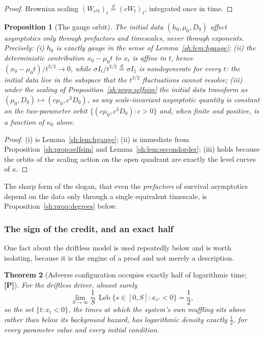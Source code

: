 \documentclass[11pt]{article}
\numberwithin{equation}{section}
\theoremstyle{plain}
\newtheorem{theorem}{Theorem}[section]
\newtheorem{proposition}[theorem]{Proposition}
\theoremstyle{definition}
\theoremstyle{remark}
\DeclareMathOperator{\Leb}{Leb}
\newcommand{\eqd}{\overset{d}{=}}
\begin{document}
\begin{proof}
Brownian scaling $(W_{c^2t})_t\eqd(cW_t)_t$, integrated once in time.
\end{proof}

\begin{proposition}[The gauge orbit]\label{sh:prop:gauge}
The initial data $(h_0,\mu_0,D_0)$ affect asymptotics only through
prefactors and timescales, never through exponents. Precisely:
\emph{(i)} $h_0$ is exactly gauge in the sense of
Lemma~\ref{sh:lem:hgauge};
\emph{(ii)} the deterministic contribution
$x_0-\mu_0t$ to $x_t$ is affine in $t$, hence
$(x_0-\mu_0t)/t^{3/2}\to0$, while $\sigma I_t/t^{3/2}\eqd\sigma I_1$ is
nondegenerate for every $t$: the initial data live in the subspace that the
$t^{3/2}$ fluctuations cannot resolve;
\emph{(iii)} under the scaling of Proposition~\ref{sh:prop:selfsim} the
initial data transform as $(\mu_0,D_0)\mapsto(c\mu_0,c^3D_0)$, so any
scale-invariant asymptotic quantity is constant on the two-parameter orbit
$\{(c\mu_0,c^3D_0):c>0\}$ and, when finite and positive, is a function of
$\kappa_0$ alone.
\end{proposition}

\begin{proof}
(i) is Lemma~\ref{sh:lem:hgauge}; (ii) is immediate from
Proposition~\ref{sh:prop:selfsim} and Lemma~\ref{sh:lem:secondorder};
(iii) holds because the orbits of the scaling action on the open quadrant
are exactly the level curves of $\kappa$.
\end{proof}

The sharp form of the slogan, that even the \emph{prefactors} of survival
asymptotics depend on the data only through a single equivalent timescale, is Proposition~\ref{sh:prop:degrees} below.

\subsubsection{The sign of the credit, and an exact half}
\label{gr1:subsub:sign}

One fact about the driftless model is used repeatedly below and is worth
isolating, because it is the engine of a proof and not merely a
description.

\begin{theorem}[Adverse configuration occupies exactly half of
logarithmic time; \textbf{[P]}]\label{tc:thm:half}
For the driftless driver, almost surely
\begin{equation}\label{tc:eq:half}
\lim_{S\to\infty}\frac1S\,\Leb\bigl\{s\in[0,S]:x_{e^{s}}<0\bigr\}
=\frac12 ,
\end{equation}
so the set $\{t:x_t<0\}$, the times at which the system's own
muffling sits \emph{above} rather than below its background hazard, has logarithmic density exactly $\tfrac12$, for every parameter value
and every initial condition.
\end{theorem}
\end{document}
